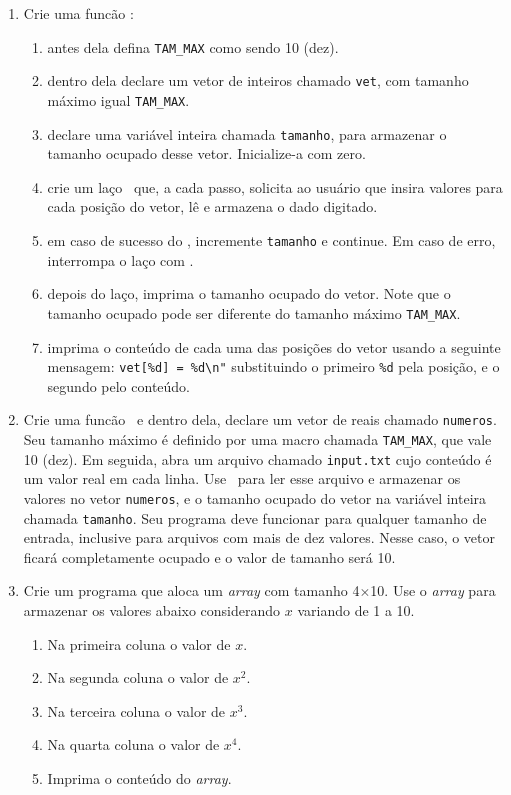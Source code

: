 \begin{enumerate}

  \item Crie uma funcão \MAIN:
    \begin{enumerate}
      \item antes dela defina \verb|TAM_MAX| como sendo 10 (dez).
      \item dentro dela declare um vetor de inteiros chamado {\tt vet}, com tamanho máximo igual \verb|TAM_MAX|.
      \item declare uma variável inteira chamada {\tt tamanho}, para armazenar o tamanho ocupado desse vetor. Inicialize-a com zero.
      \item crie um laço \FOR\ que, a cada passo, solicita ao usuário que insira valores para cada posição do vetor, lê e armazena o dado digitado.
      \item em caso de sucesso do \SCANF, incremente {\tt tamanho} e continue. Em caso de erro, interrompa o laço com \BREAK.
      \item depois do laço, imprima o tamanho ocupado do vetor. Note que o tamanho ocupado pode ser diferente do tamanho máximo \verb|TAM_MAX|.
      \item imprima o conteúdo de cada uma das posições do vetor usando a seguinte mensagem: \verb|vet[%d] = %d\n"| substituindo o primeiro \verb|%d| pela posição, e o segundo pelo conteúdo.
    \end{enumerate}

  \item Crie uma funcão \MAIN\ e dentro dela, declare um vetor de reais chamado {\tt numeros}. Seu tamanho máximo é definido por uma macro chamada \verb|TAM_MAX|, que vale 10 (dez). Em seguida, abra um arquivo chamado {\tt input.txt} cujo conteúdo é um valor real em cada linha. Use \FSCANF\ para ler esse arquivo e armazenar os valores no vetor {\tt numeros}, e o tamanho ocupado do vetor na variável inteira chamada {\tt tamanho}. Seu programa deve funcionar para qualquer tamanho de entrada, inclusive para arquivos com mais de dez valores. Nesse caso, o vetor ficará completamente ocupado e o valor de tamanho será 10.

  \item Crie um programa que aloca um \textit{array} com tamanho 4$\times$10. Use o \textit{array} para armazenar os valores abaixo considerando $x$ variando de 1 a 10.
    \begin{enumerate}
      \item Na primeira coluna o valor de $x$.
      \item Na segunda coluna o valor de $x^2$.
      \item Na terceira coluna o valor de $x^3$.
      \item Na quarta coluna o valor de $x^4$.
      \item Imprima o conteúdo do \textit{array}.
    \end{enumerate}


\end{enumerate}
